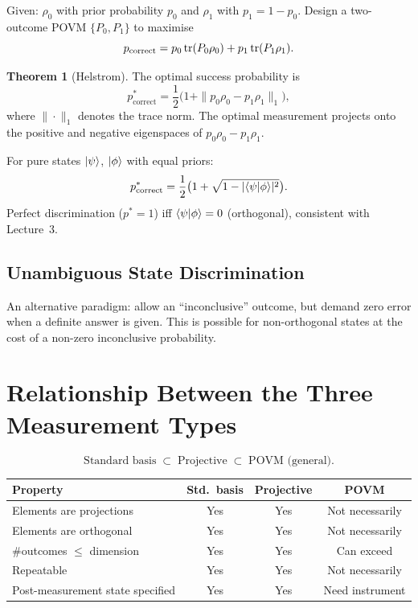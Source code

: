 \documentclass[11pt]{article}
\theoremstyle{definition}
\newtheorem{theorem}{Theorem}[section]
\begin{document}
Given: $\rho_0$ with prior probability $p_0$ and $\rho_1$ with $p_1=1-p_0$.  Design a two-outcome POVM $\{P_0,P_1\}$ to maximise
\[
    p_{\text{correct}} = p_0\tr(P_0\rho_0)+p_1\tr(P_1\rho_1).
\]

\begin{theorem}[Helstrom]
The optimal success probability is
\[
    p_{\text{correct}}^* = \frac{1}{2}\bigl(1+\|p_0\rho_0-p_1\rho_1\|_1\bigr),
\]
where $\|\cdot\|_1$ denotes the trace norm.  The optimal measurement projects onto the positive and negative eigenspaces of $p_0\rho_0-p_1\rho_1$.
\end{theorem}

For pure states $\ket{\psi}$, $\ket{\phi}$ with equal priors:
\[
    p_{\text{correct}}^* = \frac{1}{2}\bigl(1+\sqrt{1-|\!\braket{\psi}{\phi}\!|^2}\bigr).
\]
Perfect discrimination ($p^*=1$) iff $\braket{\psi}{\phi}=0$ (orthogonal), consistent with Lecture~3.

\subsection{Unambiguous State Discrimination}

An alternative paradigm: allow an ``inconclusive'' outcome, but demand zero error when a definite answer is given.  This is possible for non-orthogonal states at the cost of a non-zero inconclusive probability.

\section{Relationship Between the Three Measurement Types}

\[
    \text{Standard basis} \;\subset\; \text{Projective} \;\subset\; \text{POVM (general)}.
\]

\begin{center}
\begin{tabular}{lccc}
\hline
\textbf{Property} & \textbf{Std.\ basis} & \textbf{Projective} & \textbf{POVM} \\\hline
Elements are projections & Yes & Yes & Not necessarily \\
Elements are orthogonal & Yes & Yes & Not necessarily \\
$\#$outcomes $\le$ dimension & Yes & Yes & Can exceed \\
Repeatable & Yes & Yes & Not necessarily \\
Post-measurement state specified & Yes & Yes & Need instrument \\
\hline
\end{tabular}
\end{center}
\end{document}
